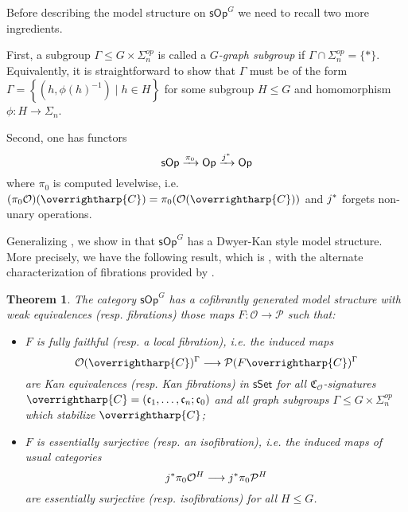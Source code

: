 \documentclass[a4paper,10pt
,draft
]{article}%
\numberwithin{equation}{section}
\numberwithin{figure}{section}
\newtheorem{theorem}[equation]{Theorem}%
\theoremstyle{definition} %
\newcommand{\sets}[2]{\left\{ #1 \;|\; #2\right\}}%
\newcommand{\longto}{\longrightarrow}%
\newcommand{\vect}[1]{\text{\overrightharp{\ensuremath{#1}}}}
\newcommand{\sSet}{\ensuremath{\mathsf{sSet}}}%
\newcommand{\sOp}{\ensuremath{\mathsf{sOp}}}%
\renewcommand{\O}{\ensuremath{\mathcal O}}
\renewcommand{\P}{\ensuremath{\mathcal P}}
\newcommand{\1}{\ensuremath{\mathbbm 1}}%
\begin{document}
Before describing the model structure on $\mathsf{sOp}^G$
we need to recall two more ingredients.

First, 
a subgroup $\Gamma \leq G \times \Sigma_n^{op}$
is called a \emph{$G$-graph subgroup}
if $\Gamma \cap \Sigma_n^{op} = \{*\}$.
Equivalently, it is straightforward to show
that $\Gamma$ must be of the form 
$\Gamma = \sets{(h,\phi(h)^{-1})}{h \in H}$
for some subgroup $H \leq G$
and homomorphism $\phi \colon H \to \Sigma_n$.

Second, one has functors
\[
	\mathsf{sOp} \xrightarrow{\pi_0}
	\mathsf{Op} \xrightarrow{j^{\**}}
	\mathsf{Op}
\]
where $\pi_0$ is computed levelwise,
i.e. 
$(\pi_0 \O)(\vect{C}) = 
\pi_0(\O(\vect{C}))$
and
$j^{\**}$ forgets non-unary operations.


Generalizing \cite{Ber07b,CM13b},
we show in \cite{BP_HGOP}
that $\mathsf{sOp}^G$ 
has a Dwyer-Kan style model structure.
More precisely, we have the following result, which is
\cite[Thm. III]{BP_HGOP},
with the alternate characterization of fibrations 
provided by 
\cite[Prop. 4.78]{BP_HGOP}.



\begin{theorem}\label{SOPG_THM}
      The category $\sOp^G$ has a cofibrantly generated model structure with weak equivalences (resp. fibrations) those maps
      $F \colon \O \to \P$ such that:
\begin{itemize}
\item $F$ is \emph{fully faithful} (resp. a \emph{local fibration}), i.e. the induced maps
	\begin{equation}\label{DKEQUIV_EQ}
		\O ( \vect{C})^\Gamma \longto 
		\P(F \vect{C})^\Gamma
	\end{equation}
	are Kan equivalences (resp. Kan fibrations) in $\sSet$
	for all $\mathfrak C_\O$-signatures $\vect C = (\mathfrak c_1, \dots, \mathfrak c_n; \mathfrak c_0)$
	and all graph subgroups $\Gamma \leq G \times \Sigma_n^{op}$ which stabilize $\vect C$;
\item $F$ is \emph{essentially surjective} (resp. an \emph{isofibration}), i.e. the induced maps of usual categories
	\begin{equation}\label{ESSSURJ EQ}
		j^{\**}\pi_0 \O^H \longto j^{\**}\pi_0 \P^H
	\end{equation}
	are essentially surjective (resp. isofibrations) for all $H \leq G$.
\end{itemize}
\end{theorem}
\end{document}
